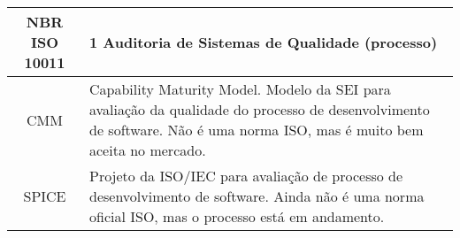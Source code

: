 \begin{table}[H]
\begin{tabular}{|cp{8cm}|}
			
			\vspace*{0,15cm} NBR ISO 10011 & 1 Auditoria de Sistemas de Qualidade (processo) \vspace*{0,15cm}\\ \hline
            
            
            \vspace*{0,15cm} CMM & Capability Maturity Model. Modelo da SEI para avaliação da
qualidade do processo de desenvolvimento de software. Não é uma
norma ISO, mas é muito bem aceita no mercado. \vspace*{0,15cm}\\ \hline
            
            
            \vspace*{0,15cm} SPICE & Projeto da ISO/IEC para avaliação de processo de desenvolvimento de
software. Ainda não é uma norma oficial ISO, mas o processo está em
andamento. \vspace*{0,15cm}\\ \hline
        \hline
    \end{tabular}
\end{table}
\vspace*{-0,9cm}
{\raggedright {}}